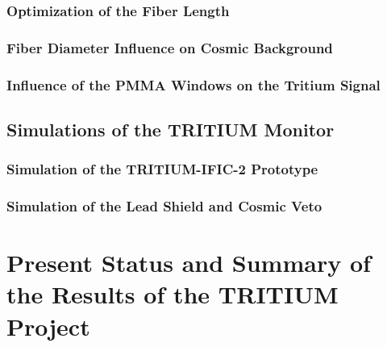 \documentclass[12pt,a4paper]{book}
\begin{document}
		\subsection{Optimization of the Fiber Length}\label{subsec:FiberLengthSimulation}
		
				
		\subsection{Fiber Diameter Influence on Cosmic Background}\label{subsec:FiberDiameterSimulation}
		
		
		\subsection[Influence of the PMMA Windows on the Tritium Signal]{Influence of the PMMA Windows on the Tritium Signal}\label{subsec:PMMAWindowsSimulation}
			
						
	\section{Simulations of the TRITIUM Monitor}\label{sec:TRITIUMMonitorSimulation}
	
		
		\subsection{Simulation of the TRITIUM-IFIC-2 Prototype}\label{subsec:TritiumIFIC2Simulation}
		
		
		\subsection[Lead Shield and Cosmic Veto]{Simulation of the Lead Shield and Cosmic Veto}\label{subsec:LeadCosmicSimulation}
		
		\newpage
		
\fancyhead[LE]{\leftmark}

\chapter{Present Status and Summary of the Results of the TRITIUM Project}  \label{chap:Summary}

\newpage
\end{document}
